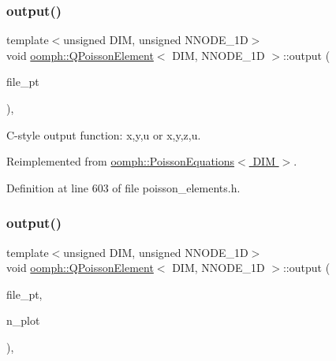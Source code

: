 \subsubsection{\texorpdfstring{output()}{output()}\hspace{0.1cm}{\footnotesize\ttfamily [3/4]}}
{\footnotesize\ttfamily template$<$unsigned D\+IM, unsigned N\+N\+O\+D\+E\+\_\+1D$>$ \\
void \hyperlink{classoomph_1_1QPoissonElement}{oomph\+::\+Q\+Poisson\+Element}$<$ D\+IM, N\+N\+O\+D\+E\+\_\+1D $>$\+::output (\begin{DoxyParamCaption}\item[{F\+I\+LE $\ast$}]{file\+\_\+pt }\end{DoxyParamCaption})\hspace{0.3cm}{\ttfamily [inline]}, {\ttfamily [virtual]}}



C-\/style output function\+: x,y,u or x,y,z,u. 



Reimplemented from \hyperlink{classoomph_1_1PoissonEquations_afeaa8b136b9cc9649635b41bde1b5cda}{oomph\+::\+Poisson\+Equations$<$ D\+I\+M $>$}.



Definition at line 603 of file poisson\+\_\+elements.\+h.

\mbox{\label{classoomph_1_1QPoissonElement_af6fd3511d4cd349ffa7dff0549fdaefe}} 
\subsubsection{\texorpdfstring{output()}{output()}\hspace{0.1cm}{\footnotesize\ttfamily [4/4]}}
{\footnotesize\ttfamily template$<$unsigned D\+IM, unsigned N\+N\+O\+D\+E\+\_\+1D$>$ \\
void \hyperlink{classoomph_1_1QPoissonElement}{oomph\+::\+Q\+Poisson\+Element}$<$ D\+IM, N\+N\+O\+D\+E\+\_\+1D $>$\+::output (\begin{DoxyParamCaption}\item[{F\+I\+LE $\ast$}]{file\+\_\+pt,  }\item[{const unsigned \&}]{n\+\_\+plot }\end{DoxyParamCaption})\hspace{0.3cm}{\ttfamily [inline]}, {\ttfamily [virtual]}}



